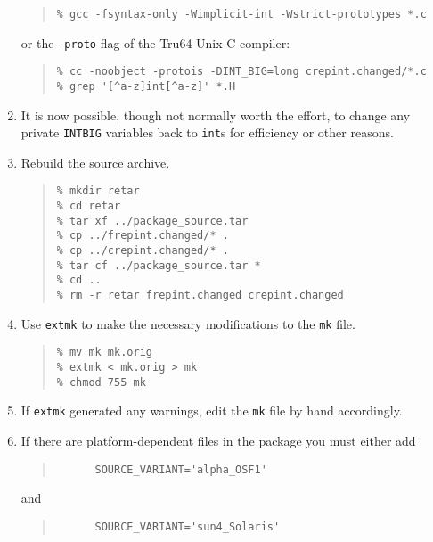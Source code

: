 \documentclass[twoside,11pt]{article}
\newcommand{\htmlref}[2]{#1}
\newcommand{\html}[1]{}
\renewcommand{\_}{\texttt{\symbol{95}}}
\newcommand{\xroutine}[1]{\htmlref{{\tt #1}}{#1}}
\newcommand{\file}[1]{{\tt #1}}
\newcommand{\routine}[1]{{\tt #1}}
\newcommand{\cc}[1]{{\tt #1}}
\newenvironment{squote}{\begin{quote}\begin{small}}{\end{small}\end{quote}}
\begin{document}
\begin{enumerate}
\begin{squote}
\begin{verbatim}
% gcc -fsyntax-only -Wimplicit-int -Wstrict-prototypes *.c
\end{verbatim}
\end{squote}
or the {\tt -proto} flag of the Tru64 Unix C compiler:
\begin{squote}
\begin{verbatim}
% cc -noobject -protois -DINT_BIG=long crepint.changed/*.c
% grep '[^a-z]int[^a-z]' *.H
\end{verbatim}
\end{squote}
%
\item
It is now possible, though not normally worth the effort, 
to change any private \cc{INT\_BIG} variables back to \cc{int}s
for efficiency or other reasons.
\html{\begin{squote}\end{squote}}
%
\item
Rebuild the source archive.
\begin{squote}
\begin{verbatim}
% mkdir retar
% cd retar
% tar xf ../package_source.tar
% cp ../frepint.changed/* .
% cp ../crepint.changed/* .
% tar cf ../package_source.tar *
% cd ..
% rm -r retar frepint.changed crepint.changed
\end{verbatim}
\end{squote}
%
\item
Use \xroutine{extmk} to make the necessary modifications to the \file{mk} file.
\begin{squote}
\begin{verbatim}
% mv mk mk.orig
% extmk < mk.orig > mk
% chmod 755 mk
\end{verbatim}
\end{squote}
%
\item
If \routine{extmk} generated any warnings, edit the \file{mk} file by
hand accordingly.
\html{\begin{squote}\end{squote}}
%
\item
If there are platform-dependent files in the package you must either add
\begin{squote}
\begin{verbatim}
      SOURCE_VARIANT='alpha_OSF1'
\end{verbatim}
\end{squote}
and
\begin{squote}
\begin{verbatim}
      SOURCE_VARIANT='sun4_Solaris'

\end{verbatim}
\end{squote}
\end{enumerate}
\end{document}
